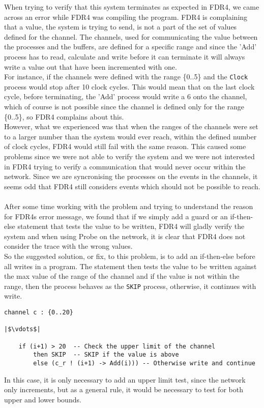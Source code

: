 When trying to verify that this system terminates as expected in FDR4, we came across an error while FDR4 was compiling the program.
FDR4 is complaining that a value, the system is trying to send, is not a part of the set of values defined for the channel.
The channels, used for communicating the value between the processes and the buffers, are defined for a specific range and since the 'Add' process has to read, calculate and write before it can terminate it will always write a value out that have been incremented with one.\\
For instance, if the channels were defined with the range \{0..5\} and the \texttt{Clock} process would stop after 10 clock cycles. This would mean that on the last clock cycle, before terminating, the 'Add' process would write a 6 onto the channel, which of course is not possible since the channel is defined only for the range \{0..5\}, so FDR4 complains about this.\\
However, what we experienced was that when the ranges of the channels were set to a larger number than the system would ever reach, within the defined number of clock cycles, FDR4 would still fail with the same reason.
This caused some problems since we were not able to verify the system and we were not interested in FDR4 trying to verify a communication that would never occur within the network.
Since we are syncronising the processes on the events in the channels, it seems odd that FDR4 still considers events which should not be possible to reach.  \\\\
After some time working with the problem and trying to understand the reason for FDR4s error message, we found that if we simply add a guard or an if-then-else statement that tests the value to be written, FDR4 will gladly verify the system and when using Probe on the network, it is clear that FDR4 does not consider the trace with the wrong values. \\

So the suggested solution, or fix, to this problem, is to add an if-then-else before all writes in a program. The statement then tests the value to be written against the max value of the range of the channel and if the value is not within the range, then the process behaves as the \texttt{SKIP} process, otherwise, it continues with write.
\begin{verbatim}
channel c : {0..20}

|$\vdots$|

    if (i+1) > 20  -- Check the upper limit of the channel
        then SKIP  -- SKIP if the value is above
        else (c_r ! (i+1) -> Add(i))) -- Otherwise write and continue
\end{verbatim}
In this case, it is only necessary to add an upper limit test, since the network only increments, but as a general rule, it would be necessary to test for both upper and lower bounds.


